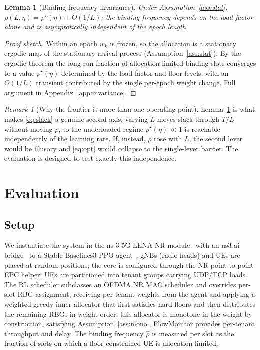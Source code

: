 \documentclass[conference]{IEEEtran}
\newtheorem{lemma}{Lemma}
\theoremstyle{definition}
\theoremstyle{remark}
\newtheorem{remark}{Remark}
\newcommand{\Slots}{T}
\newcommand{\Ep}{L}
\newcommand{\rhobind}{\rho}
\newcommand{\load}{\eta}
\newcommand{\wt}{w}
\begin{document}
\begin{lemma}[Binding-frequency invariance]\label{lem:invariance}
Under Assumption~\ref{ass:stat}, $\rhobind(\Ep,\load)=\rhobind^\star(\load)+O(1/\Ep)$; the binding frequency depends on the load factor alone and is asymptotically independent of the epoch length.
\end{lemma}

\begin{proof}[Proof sketch]
Within an epoch $\wt_k$ is frozen, so the allocation is a stationary ergodic map of the stationary arrival process (Assumption~\ref{ass:stat}). By the ergodic theorem the long-run fraction of allocation-limited binding slots converges to a value $\rhobind^\star(\load)$ determined by the load factor and floor levels, with an $O(1/\Ep)$ transient contributed by the single per-epoch weight change. Full argument in Appendix~\ref{app:invariance}.
\end{proof}

\begin{remark}[Why the frontier is more than one operating point]
Lemma~\ref{lem:invariance} is what makes \eqref{eq:slack} a genuine second axis: varying $\Ep$ moves slack through $\Slots/\Ep$ without moving $\rhobind$, so the underloaded regime $\rhobind^\star(\load)\ll1$ is reachable independently of the learning rate. If, instead, $\rhobind$ rose with $\Ep$, the second lever would be illusory and \eqref{eq:opt} would collapse to the single-lever barrier. The evaluation is designed to test exactly this independence.
\end{remark}

\section{Evaluation}\label{sec:eval}

\subsection{Setup}
We instantiate the system in the ns-3 5G-LENA NR module~\cite{ref:5glena} with an ns3-ai bridge~\cite{ref:ns3ai} to a Stable-Baselines3 PPO agent~\cite{ref:sb3}. gNBs (radio heads) and UEs are placed at random positions; the core is configured through the NR point-to-point EPC helper; UEs are partitioned into tenant groups carrying UDP/TCP loads. The RL scheduler subclasses an OFDMA NR MAC scheduler and overrides per-slot RBG assignment, receiving per-tenant weights from the agent and applying a weighted-greedy inner allocator that first satisfies hard floors and then distributes the remaining RBGs in weight order; this allocator is monotone in the weight by construction, satisfying Assumption~\ref{ass:mono}. FlowMonitor provides per-tenant throughput and delay. The binding frequency $\hat\rhobind$ is measured per slot as the fraction of slots on which a floor-constrained UE is allocation-limited.
\end{document}
